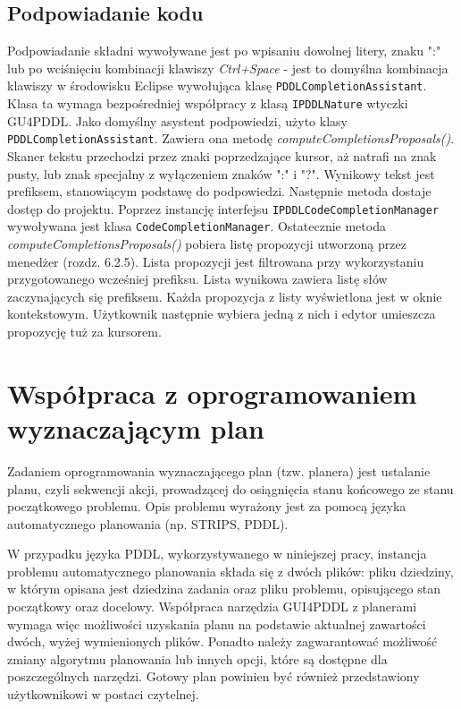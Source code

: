 \subsection{Podpowiadanie kodu}
Podpowiadanie składni wywoływane jest po wpisaniu dowolnej litery, znaku ":" lub po wciśnięciu kombinacji klawiszy \emph{Ctrl+Space} - jest to domyślna kombinacja klawiszy w środowisku Eclipse wywołująca klasę \texttt{PDDLCompletionAssistant}. Klasa ta wymaga bezpośredniej współpracy z klasą \texttt{IPDDLNature} wtyczki GU4PDDL. Jako domyślny asystent podpowiedzi, użyto klasy \texttt{PDDLCompletionAssistant}. Zawiera ona metodę \emph{computeCompletionsProposals()}. Skaner tekstu przechodzi przez znaki poprzedzające kursor, aż natrafi na znak pusty, lub znak specjalny z wyłączeniem znaków ":" i "?". Wynikowy tekst jest prefiksem, stanowiącym podstawę do podpowiedzi. Następnie metoda dostaje dostęp do projektu. Poprzez instancję interfejsu \texttt{IPDDLCodeCompletionManager} wywoływana jest klasa \texttt{CodeCompletionManager}. Ostatecznie metoda \emph{computeCompletionsProposals()} pobiera listę propozycji utworzoną przez menedżer (rozdz. 6.2.5). Lista propozycji jest filtrowana przy wykorzystaniu przygotowanego wcześniej prefiksu. Lista wynikowa zawiera listę słów zaczynających się prefiksem. Każda propozycja z listy wyświetlona jest w oknie kontekstowym. Użytkownik następnie wybiera jedną z nich i edytor umieszcza propozycję tuż za kursorem.





\section{Współpraca z oprogramowaniem wyznaczającym plan}
\label{sec:wspolpraca}
Zadaniem oprogramowania wyznaczającego plan (tzw. planera) jest ustalanie planu, czyli sekwencji akcji, prowadzącej do osiągnięcia stanu końcowego ze stanu początkowego problemu. Opis problemu wyrażony jest za pomocą języka automatycznego planowania (np. STRIPS, PDDL). 

W przypadku języka PDDL, wykorzystywanego w niniejszej pracy, instancja problemu automatycznego planowania składa się z dwóch plików: pliku dziedziny, w którym opisana jest dziedzina zadania oraz pliku problemu, opisującego stan początkowy oraz docelowy. Współpraca narzędzia GUI4PDDL z planerami wymaga więc możliwości uzyskania planu na podstawie aktualnej zawartości dwóch, wyżej wymienionych plików. Ponadto należy zagwarantować możliwość zmiany algorytmu planowania lub innych opcji, które są dostępne dla poszczególnych narzędzi. Gotowy plan powinien być również przedstawiony użytkownikowi w postaci czytelnej.

